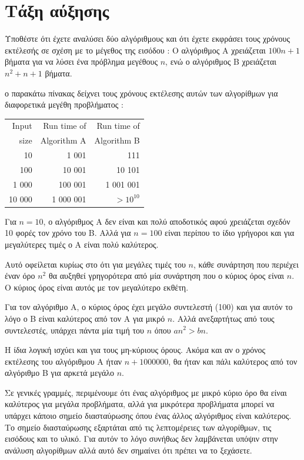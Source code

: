 \documentclass[10pt]{book}
\begin{document}
\section{Τάξη αύξησης}

Υποθέστε ότι έχετε αναλύσει δύο αλγόριθμους και ότι έχετε εκφράσει τους χρόνους 
εκτέλεσής σε σχέση με το μέγεθος της εισόδου :  
Ο αλγόριθμος Α χρειάζεται $100n+1$ βήματα για να λύσει ένα πρόβλημα μεγέθους $n$, ενώ ο αλγόριθμος Β χρειάζεται $n^2 + n + 1$ βήματα.

ο παρακάτω πίνακας δείχνει τους χρόνους εκτέλεσης αυτών των αλγορίθμων για διαφορετικά μεγέθη προβλήματος :

\begin{tabular}{|r|r|r|}
\hline
Input     &   Run time of     & Run time of \\
size      &   Algorithm A     & Algorithm B \\
\hline
10        &   1 001           & 111         \\
100       &   10 001          & 10 101         \\
1 000     &   100 001         & 1 001 001         \\
10 000    &   1 000 001       & $> 10^{10}$         \\
\hline
\end{tabular}

 Για   $n=10$,  ο αλγόριθμος Α δεν είναι και πολύ αποδοτικός αφού χρειάζεται σχεδόν 10 φορές τον χρόνο του Β.  Αλλά για $n=100$ είναι περίπου το ίδιο γρήγοροι και για μεγαλύτερες τιμές ο Α είναι πολύ καλύτερος.

Αυτό οφείλεται κυρίως στο ότι για μεγάλες τιμές του $n$, κάθε συνάρτηση που περιέχει έναν όρο $n^2$ θα αυξηθεί γρηγορότερα από μία συνάρτηση που ο κύριος όρος είναι $n$. Ο κύριος όρος είναι αυτός με τον μεγαλύτερο εκθέτη.

Για τον αλγόριθμο Α, ο κύριος όρος έχει μεγάλο συντελεστή (100) και για αυτόν το 
λόγο ο Β είναι καλύτερος από τον Α για μικρό $n$.  Αλλά ανεξαρτήτως από τους συντελεστές, υπάρχει πάντα μία τιμή του $n$ όπου $a n^2 > b n$.

Η ίδια λογική ισχύει και για τους μη-κύριους όρους.  Ακόμα και αν ο χρόνος εκτέλεσης του αλγόριθμου Α ήταν $n+1000000$, θα ήταν και πάλι καλύτερος από τον 
αλγόριθμο Β για αρκετά μεγάλο $n$.

Σε γενικές γραμμές, περιμένουμε ότι ένας αλγόριθμος με μικρό κύριο όρο θα είναι 
καλύτερος για μεγάλα προβλήματα, αλλά για μικρότερα προβλήματα μπορεί να υπάρχει 
κάποιο σημείο διασταύρωσης όπου ένας άλλος αλγόριθμος είναι καλύτερος.  Το σημείο 
διασταύρωσης εξαρτάται από τις λεπτομέρειες των αλγορίθμων, τις εισόδους και το υλικό.  Για αυτόν το λόγο συνήθως δεν λαμβάνεται υπόψιν στην ανάλυση αλγορίθμων αλλά αυτό δεν σημαίνει ότι πρέπει να το ξεχάσετε.
\end{document}
